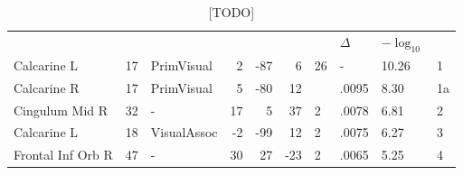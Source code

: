 \begin{table}
    \small
    \centering
    \begin{ThreePartTable}
    \begin{tabularx}{\textwidth}{l l p{1.6cm} *{3}{r} *{2}{P{1cm}} P{1.4cm} P{.5cm}}
        
     \\
    \toprule
     &  &  &  &  &  &  & \(\Delta\)  & \(-\log_{10}\) &  \\
    \toprule
Calcarine L & 17 & PrimVisual & 2 & -87 & 6 & 26 & - & 10.26 & 1 \\
Calcarine R & 17 & PrimVisual & 5 & -80 & 12 &   & .0095  & 8.30 & 1a \\
Cingulum Mid R & 32 & - & 17 & 5 & 37 & 2 & .0078 & 6.81  & 2 \\
Calcarine L & 18 & VisualAssoc & -2 & -99 & 12 & 2 & .0075& 6.27  & 3 \\
Frontal Inf Orb R & 47 & - & 30 & 27 & -23 & 2 & .0065  & 5.25  & 4 \\
\bottomrule
    \end{tabularx}
\end{ThreePartTable}
\caption[ Voxel Contrast, , Group]{[TODO] \label{tab:sigasnContrastClusters_asn}}
\end{table}

